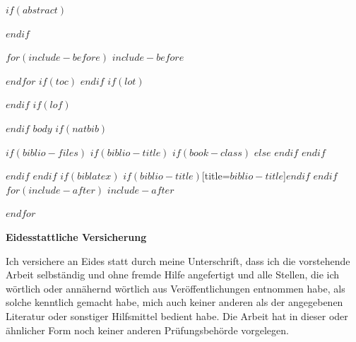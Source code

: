 \documentclass[$if(fontsize)$$fontsize$,$endif$$if(lang)$$lang$,$endif$$if(papersize)$$papersize$,$endif$$for(classoption)$$classoption$$sep$,$endfor$]{$documentclass$}
\begin{document}
$if(abstract)$
\begin{abstract}
$abstract$
\end{abstract}
$endif$

$for(include-before)$
$include-before$

$endfor$
$if(toc)$
{
\hypersetup{linkcolor=black}
\setcounter{tocdepth}{$toc-depth$}
\tableofcontents
}
$endif$
$if(lot)$
\newpage
\listoftables
$endif$
$if(lof)$
\newpage
\listoffigures
$endif$
\newpage
{} 
$body$
$if(natbib)$

$if(biblio-files)$
$if(biblio-title)$
$if(book-class)$
\renewcommand\bibname{$biblio-title$}
$else$
\renewcommand\refname{$biblio-title$}
$endif$
$endif$


$endif$
$endif$
$if(biblatex)$
\printbibliography$if(biblio-title)$[title=$biblio-title$]$endif$
$endif$
$for(include-after)$
$include-after$

$endfor$

\newpage
\textbf{Eidesstattliche Versicherung}

\bigskip

Ich versichere an Eides statt durch meine Unterschrift, dass ich die vorstehende Arbeit selbständig und ohne fremde Hilfe angefertigt und alle Stellen, die ich wörtlich oder annähernd wörtlich aus Veröffentlichungen entnommen habe, als solche kenntlich gemacht habe, mich auch keiner anderen als der angegebenen Literatur oder sonstiger Hilfsmittel bedient habe. Die Arbeit hat in dieser oder ähnlicher Form noch keiner anderen Prüfungsbehörde vorgelegen.

\vspace{1cm}
\rule{0pt}{2\baselineskip} %
\par\noindent{} \hfill\makebox[2.25in]{\hrulefill}%
\par\noindent\makebox[2.25in][l]{} \hfill{}%
\end{document}

